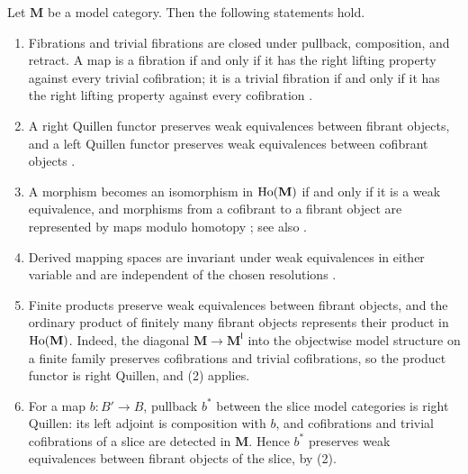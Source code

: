 \documentclass[10pt,reqno]{amsart}
\begin{document}
\begin{proposition}
\label{prop:model_category_recollections}
Let $\mathbf M$ be a model category. Then the following statements hold.
\begin{enumerate}[label=\textup{(\arabic*)}]
\item Fibrations and trivial fibrations are closed under pullback,
composition, and retract. A map is a fibration if and only if it has
the right lifting property against every trivial cofibration; it is
a trivial fibration if and only if it has the right lifting property
against every cofibration
\cite[Lemma~1.1.10 and Corollary~1.1.11]{hovey1999model}.
\item A right Quillen functor preserves weak equivalences between
fibrant objects, and a left Quillen functor preserves weak
equivalences between cofibrant objects
\cite[Lemma~1.1.12]{hovey1999model}.
\item A morphism becomes an isomorphism in $\operatorname{Ho}(\mathbf M)$ if and
only if it is a weak equivalence, and morphisms from a cofibrant to a
fibrant object are represented by maps modulo homotopy
\cite[Theorem~1.2.10]{hovey1999model};
see also \cite[Theorem~8.3.10]{hirschhorn2003model}.
\item Derived mapping spaces are invariant under weak equivalences in
either variable \cite[Theorem~17.6.3]{hirschhorn2003model} and are
independent of the chosen resolutions
\cite[Theorem~17.4.14]{hirschhorn2003model}.
\item Finite products preserve weak equivalences between fibrant
objects, and the ordinary product of finitely many fibrant objects
represents their product in $\operatorname{Ho}(\mathbf M)$. Indeed, the diagonal
$\mathbf M\to\mathbf M^{\mathsf I}$ into the objectwise model
structure on a finite family preserves cofibrations and trivial
cofibrations, so the product functor is right Quillen, and
\textup{(2)} applies.
\item For a map $b:B'\to B$, pullback $b^*$ between the slice
model categories is right Quillen: its left adjoint is composition
with $b$, and cofibrations and trivial cofibrations of a slice are
detected in $\mathbf M$. Hence $b^*$ preserves weak equivalences
between fibrant objects of the slice, by \textup{(2)}.
\end{enumerate}
\end{proposition}
\end{document}
